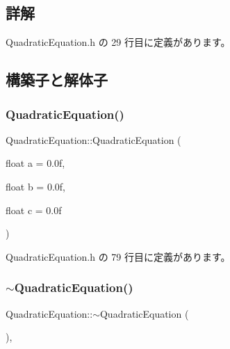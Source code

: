 \subsection{詳解}


 Quadratic\+Equation.\+h の 29 行目に定義があります。



\subsection{構築子と解体子}
\mbox{\label{class_quadratic_equation_aa95741ece4499500c45925207c175aa6}} 
\subsubsection{\texorpdfstring{Quadratic\+Equation()}{QuadraticEquation()}}
{\footnotesize\ttfamily Quadratic\+Equation\+::\+Quadratic\+Equation (\begin{DoxyParamCaption}\item[{float}]{a = {\ttfamily 0.0f},  }\item[{float}]{b = {\ttfamily 0.0f},  }\item[{float}]{c = {\ttfamily 0.0f} }\end{DoxyParamCaption})\hspace{0.3cm}{\ttfamily [inline]}}



 Quadratic\+Equation.\+h の 79 行目に定義があります。

\mbox{\label{class_quadratic_equation_a16dcf4de9fb30312e2d5b19c9e30eb00}} 
\subsubsection{\texorpdfstring{$\sim$\+Quadratic\+Equation()}{~QuadraticEquation()}}
{\footnotesize\ttfamily Quadratic\+Equation\+::$\sim$\+Quadratic\+Equation (\begin{DoxyParamCaption}{ }\end{DoxyParamCaption})\hspace{0.3cm}{\ttfamily [inline]}, {\ttfamily [virtual]}}



